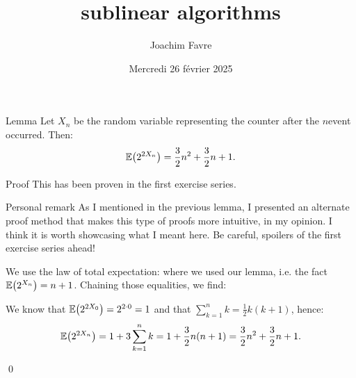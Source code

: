 \documentclass[a4paper]{article}
\title{sublinear algorithms}
\author{Joachim Favre}
\date{Mercredi 26 février 2025}
\begin{document}
\maketitle


\begin{parag}{Lemma}
    Let $X_n$ be the random variable representing the counter after the $n$\Th event occurred. Then: 
    \[\exval\left(2^{2 X_n}\right) = \frac{3}{2} n^2 + \frac{3}{2} n + 1.\]

    \begin{subparag}{Proof}
        This has been proven in the first exercise series.
    \end{subparag}

    \begin{subparag}{Personal remark}
        As I mentioned in the previous lemma, I presented an alternate proof method that makes this type of proofs more intuitive, in my opinion. I think it is worth showcasing what I meant here. Be careful, spoilers of the first exercise series ahead!

        We use the law of total expectation: 
        where we used our lemma, i.e. the fact $\exval\left(2^{X_{n}}\right) = n + 1$. Chaining those equalities, we find: 

        We know that $\exval\left(2^{2 X_0}\right) = 2^{2\cdot 0} = 1$ and that $\sum_{k=1}^{n} k = \frac{1}{2} k\left(k+1\right)$, hence: 
        \[\exval\left(2^{2X_n}\right) = 1 + 3 \sum_{k=1}^{n} k = 1 + \frac{3}{2}n\left(n+1\right) = \frac{3}{2} n^2 + \frac{3}{2} n + 1.\]
         
        \qed
    \end{subparag}
\end{parag}
\end{document}
